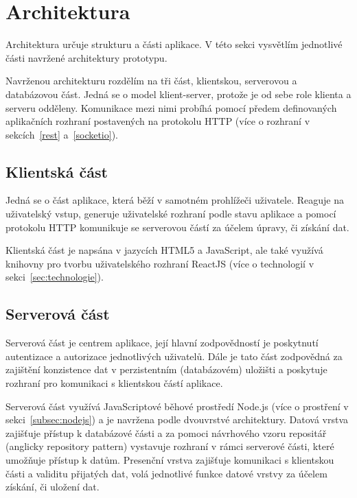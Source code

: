 
\section{Architektura}\label{sec:architektura}

Architektura určuje strukturu a části aplikace.
V této sekci vysvětlím jednotlivé části navržené architektury prototypu.

Navrženou architekturu rozdělím na tři část, klientskou, serverovou a databázovou část.
Jedná se o model klient-server, protože je od sebe role klienta a serveru odděleny.
Komunikace mezi nimi probíhá pomocí předem definovaných aplikačních rozhraní postavených na protokolu \gls{HTTP} (více o rozhraní v sekcích~\ref{rest} a~\ref{socketio}).

\subsection{Klientská část}\label{subsec:klientskáČást}

Jedná se o část aplikace, která běží v samotném prohlížeči uživatele.
Reaguje na uživatelský vstup, generuje uživatelské rozhraní podle stavu aplikace a pomocí protokolu \gls{HTTP} komunikuje se serverovou částí za účelem úpravy, či získání dat.

Klientská část je napsána v jazycích HTML5 a JavaScript, ale také využívá knihovny pro tvorbu uživatelského rozhraní ReactJS (více o technologií v sekci~\ref{sec:technologie}).

\subsection{Serverová část}\label{subsec:serverováČást}

Serverová část je centrem aplikace, její hlavní zodpovědností je poskytnutí autentizace a autorizace jednotlivých uživatelů.
Dále je tato část zodpovědná za zajištění konzistence dat v perzistentním (databázovém) uložišti a poskytuje rozhraní pro komunikaci s klientskou částí aplikace.

Serverová část využívá JavaScriptové běhové prostředí Node.js (více o prostření v sekci~\ref{subsec:nodejs}) a je navržena podle dvouvrstvé architektury.
Datová vrstva zajišťuje přístup k databázové části a za pomoci návrhového vzoru repositář (anglicky repository pattern) vystavuje rozhraní v rámci serverové části, které umožňuje přístup k datům.
Presenční vrstva zajišťuje komunikaci s klientskou části a validitu přijatých dat, volá jednotlivé funkce datové vrstvy za účelem získání, či uložení dat.

